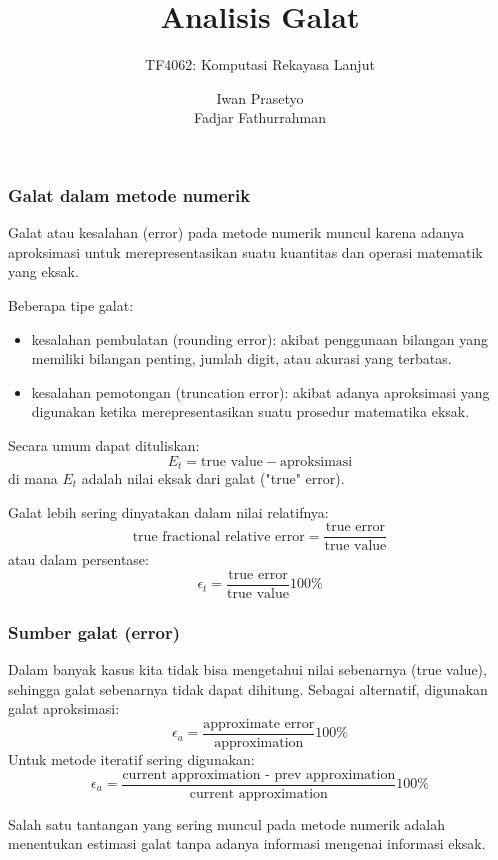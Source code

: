 \documentclass[9pt]{beamer}
\begin{document}
\title{Analisis Galat}
\subtitle{TF4062: Komputasi Rekayasa Lanjut}
\author{Iwan Prasetyo\\
Fadjar Fathurrahman}
\date{}


\frame{\titlepage}


\begin{frame}
\frametitle{Galat dalam metode numerik}

Galat atau kesalahan (error) pada metode numerik muncul karena adanya aproksimasi
untuk merepresentasikan suatu kuantitas dan operasi matematik yang eksak.

Beberapa tipe galat:
\begin{itemize}
\item kesalahan pembulatan (rounding error): akibat penggunaan bilangan yang memiliki
  bilangan penting, jumlah digit, atau akurasi yang terbatas.
\item kesalahan pemotongan (truncation error): akibat adanya aproksimasi yang digunakan
  ketika merepresentasikan suatu prosedur matematika eksak.
\end{itemize}

Secara umum dapat dituliskan:
\begin{equation}
E_{t} = \text{true value} - \text{aproksimasi}
\end{equation}
di mana $E_t$ adalah nilai eksak dari galat ("true" error).

Galat lebih sering dinyatakan dalam nilai relatifnya:
\begin{equation}
\text{true fractional relative error} = \frac{\text{true error}}{\text{true value}}
\end{equation}
atau dalam persentase:
\begin{equation}
\epsilon_{t} = \frac{\text{true error}}{\text{true value}} 100\%
\end{equation}

\end{frame}


\begin{frame}
\frametitle{Sumber galat (error)}

Dalam banyak kasus kita tidak bisa mengetahui nilai sebenarnya (true value), sehingga
galat sebenarnya tidak dapat dihitung. Sebagai alternatif, digunakan galat aproksimasi:
\begin{equation}
\epsilon_{a} = \frac{\text{approximate error}}{\text{approximation}} 100\%
\end{equation}
Untuk metode iteratif sering digunakan:
\begin{equation}
\epsilon_{a} = \frac{\text{current approximation - prev approximation}}{\text{current approximation}} 100\%
\end{equation}

Salah satu tantangan yang sering muncul pada metode numerik adalah menentukan estimasi galat
tanpa adanya informasi mengenai informasi eksak.

\end{frame}
\end{document}
